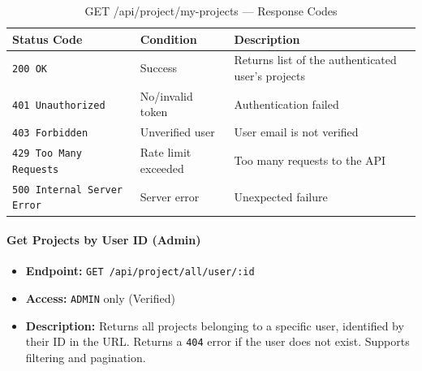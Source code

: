 \begin{table}[H]
\centering
\renewcommand{\arraystretch}{1.3}
\begin{tabularx}{\textwidth}{|l|l|X|}
\hline
\textbf{Status Code} & \textbf{Condition} & \textbf{Description} \\
\hline
\texttt{200 OK}           & Success       & Returns list of the authenticated user's projects \\
\hline
\texttt{401 Unauthorized} & No/invalid token  & Authentication failed \\
\hline
\texttt{403 Forbidden}    & Unverified user & User email is not verified \\
\hline
\texttt{429 Too Many Requests} & Rate limit exceeded & Too many requests to the API \\
\hline
\texttt{500 Internal Server Error} & Server error & Unexpected failure \\
\hline
\end{tabularx}
\caption{GET /api/project/my-projects — Response Codes}
\label{tab:get-my-projects-responses}
\end{table}
\FloatBarrier

\paragraph{Get Projects by User ID (Admin)}
\label{subsubsec:get-projects-by-user}

\begin{itemize}
  \item \textbf{Endpoint:} \texttt{GET /api/project/all/user/:id}
  \item \textbf{Access:} \texttt{ADMIN} only (Verified)
  \item \textbf{Description:} Returns all projects belonging to a specific user,
  identified by their ID in the URL. Returns a \texttt{404} error if the user does
  not exist. Supports filtering and pagination.
\end{itemize}

